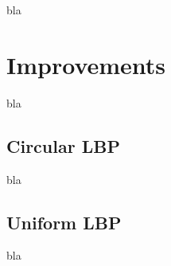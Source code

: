 \vspace{\baselineskip}
\noindent bla
\newline

\section{Improvements}

\vspace{\baselineskip}
\noindent bla
\newline

\subsection{Circular LBP}

\vspace{\baselineskip}
\noindent bla
\newline

\subsection{Uniform LBP}

\vspace{\baselineskip}
\noindent bla
\newline
